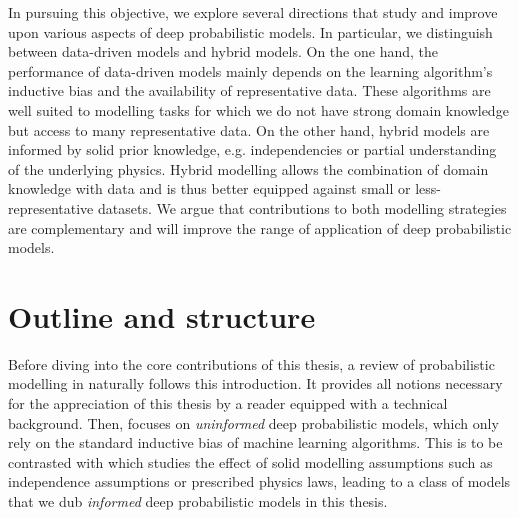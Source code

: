 In pursuing this objective, we explore several directions that study and improve upon various aspects of deep probabilistic models. In particular, we distinguish between data-driven models and hybrid models. On the one hand, the performance of data-driven models mainly depends on the learning algorithm's inductive bias and the availability of representative data. These algorithms are well suited to modelling tasks for which we do not have strong domain knowledge but access to many representative data. On the other hand, hybrid models are informed by solid prior knowledge, e.g. independencies or partial understanding of the underlying physics. Hybrid modelling allows the combination of domain knowledge with data and is thus better equipped against small or less-representative datasets. We argue that contributions to both modelling strategies are complementary and will improve the range of application of deep probabilistic models.





\section{Outline and structure}

Before diving into the core contributions of this thesis, a review of probabilistic modelling in  naturally follows this introduction. It provides all notions necessary for the appreciation of this thesis by a reader equipped with a technical background. Then,  focuses on \textit{uninformed} deep probabilistic models, which only rely on the standard inductive bias of machine learning algorithms. This is to be contrasted with  which studies the effect of solid modelling assumptions such as independence assumptions or prescribed physics laws, leading to a class of models that we dub \textit{informed} deep probabilistic models in this thesis.

